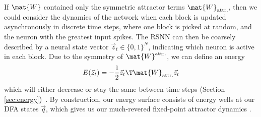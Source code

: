 If $\mat{W}$ contained only the symmetric attractor terms $\mat{W}_\text{attr.}$, then we could consider the dynamics of the network when each block is updated asynchronously in discrete time steps, where one block is picked at random, and the neuron with the greatest input spikes.
The RSNN can then be coarsely described by a neural state vector $\vec{z}_t \in \{0, 1\}^N$, indicating which neuron is active in each block. Due to the symmetry of $\mat{W}^\text{attr.}$, we can define an energy
\begin{equation}
    E(\vec{z}_t) = - \frac{1}{2}\vec{z}_t\T \mat{W}_\text{attr.} \vec{z}_t
\end{equation}
which will either decrease or stay the same between time steps (Section \ref{sec:energy})~\cite{cohen_absolute_1983}. By construction, our energy surface consists of energy wells at our DFA states $\vec{q}$, which gives us our much-revered fixed-point attractor dynamics \cite{tsodyks_enhanced_1988, amari_characteristics_1989}.

